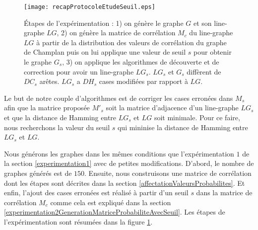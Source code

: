 \begin{figure}[htb!] 
\centering
\texttt{[image: recapProtocoleEtudeSeuil.eps]}
\caption{\'Etapes de l'exp\'erimentation :  
1) on g\'en\`ere le graphe $G$ et son line-graphe $LG$, 
2) on  g\'en\`ere la matrice de corr\'elation $M_c$ du line-graphe $LG$   \`a partir de la distribution des valeurs de corr\'elation du graphe de Champlan puis on lui applique une valeur de seuil $s$ pour obtenir le graphe $G_{s}$, 
3) on applique les algorithmes de d\'ecouverte et de correction pour avoir un line-graphe $LG_{s}$. $LG_{s}$ et  $G_{s}$ diff\`erent de $DC_{s}$ ar\^etes. $LG_{s}$ a $DH_{s}$ cases modifi\'ees par rapport \`a $LG$.
}
\label{recapProtocoleEtudeSeuil} 
\end{figure}

Le but de notre couple d'algorithmes est de corriger les cases erron\'ees dans $M_s$ afin que la matrice propos\'ee $M'_{s}$ soit la matrice d'adjacence d'un line-graphe $LG_s$ et que la distance de Hamming entre $LG_s$ et $LG$ soit minimale. 
Pour ce faire, nous recherchons la valeur du seuil $s$ qui mininise la distance de Hamming entre $LG_s$ et $LG$.
\newline

Nous g\'en\'erons les graphes dans les m\^emes conditions que l'exp\'erimentation $1$ de la section \ref{experimentation1} avec de petites modifications. D'abord, le nombre de graphes g\'en\'er\'es est de $150$. Ensuite, nous construisons une matrice de corr\'elation dont les \'etapes sont d\'ecrites dans la section \ref{affectationValeursProbabilites}. Et enfin, l'ajout des cases erron\'ees est r\'ealis\'e \`a partir d'un seuil $s$ dans la matrice de corr\'elation $M_c$ comme cela est expliqu\'e dans la section \ref{experimentation2GenerationMatriceProbabiliteAvecSeuil}. 
Les \'etapes de l'exp\'erimentation sont r\'esum\'ees dans la figure \ref{recapProtocoleEtudeSeuil}.

